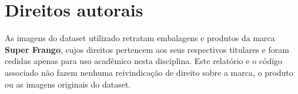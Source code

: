 \documentclass[a4paper,11pt]{article}
\begin{document}
\section{Direitos autorais}

As imagens do dataset utilizado retratam embalagens e produtos da marca \textbf{Super Frango},
cujos direitos pertencem aos seus respectivos titulares e foram cedidas apenas para uso
acadêmico nesta disciplina. Este relatório e o código associado não fazem nenhuma reivindicação
de direito sobre a marca, o produto ou as imagens originais do dataset.
\end{document}
